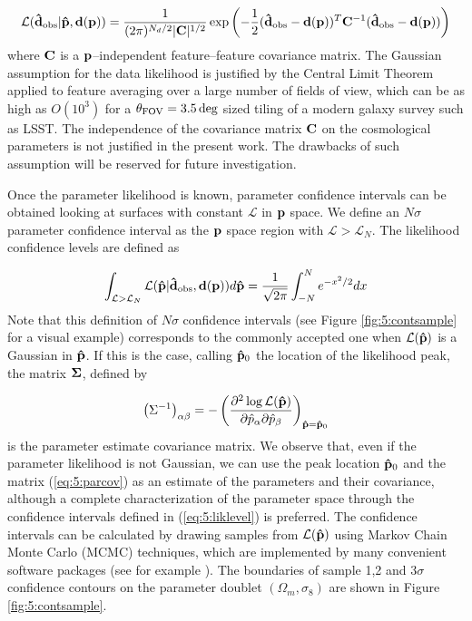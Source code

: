 \begin{equation}
\label{eq:5:gaussfeatlik}
\mathcal{L}(\mathbf{\hat{d}}_{\rm obs}\vert\mathbf{\hat{p}},\mathbf{d}(\mathbf{p})) = \frac{1}{(2\pi)^{N_d/2}\vert\mathbf{C}\vert^{1/2}}\exp\left(-\frac{1}{2}(\mathbf{\hat{d}}_{\rm obs}-\mathbf{d}(\mathbf{p}))^T\mathbf{C}^{-1}(\mathbf{\hat{d}}_{\rm obs}-\mathbf{d}(\mathbf{p}))\right) 
\end{equation}
%
where $\mathbf{C}$ is a $\mathbf{p}$--independent feature--feature covariance matrix. The Gaussian assumption for the data likelihood is justified by the Central Limit Theorem applied to feature averaging over a large number of fields of view, which can be as high as $O(10^3)$ for a $\theta_{\rm FOV}=3.5\,{\rm deg}$ sized tiling of a modern galaxy survey such as LSST. The independence of the covariance matrix $\mathbf{C}$ on the cosmological parameters is not justified in the present work. The drawbacks of such assumption will be reserved for future investigation. 

Once the parameter likelihood is known, parameter confidence intervals can be obtained looking at surfaces with constant $\mathcal{L}$ in $\mathbf{p}$ space. We define an $N\sigma$ parameter confidence interval as the $\mathbf{p}$ space region with $\mathcal{L}>\mathcal{L}_N$. The likelihood confidence levels are defined as 

\begin{equation}
\label{eq:5:liklevel}
\int_{\mathcal{L}>\mathcal{L}_N}\mathcal{L}(\mathbf{\hat{p}}\vert\mathbf{\hat{d}}_{\rm obs},\mathbf{d}(\mathbf{p})) d\mathbf{\hat{p}} = \frac{1}{\sqrt{2\pi}}\int_{-N}^Ne^{-x^2/2}dx
\end{equation}  
%
Note that this definition of $N\sigma$ confidence intervals (see Figure \ref{fig:5:contsample} for a visual example) corresponds to the commonly accepted one when $\mathcal{L}(\mathbf{\hat{p}})$ is a Gaussian in $\mathbf{\hat{p}}$. If this is the case, calling $\mathbf{\hat{p}}_0$ the location of the likelihood peak, the matrix $\mathbf{\Sigma}$, defined by

\begin{equation}
\label{eq:5:parcov}
\left(\Sigma^{-1}\right)_{\alpha\beta} = -\left(\frac{\partial^2\log\mathcal{L}(\mathbf{\hat{p}})}{\partial\hat{p}_\alpha\partial\hat{p}_\beta}\right)_{\mathbf{\hat{p}}=\mathbf{\hat{p}}_0}
\end{equation}
%
is the parameter estimate covariance matrix. We observe that, even if the parameter likelihood is not Gaussian, we can use the peak location $\mathbf{\hat{p}}_0$ and the matrix (\ref{eq:5:parcov}) as an estimate of the parameters and their covariance, although a complete characterization of the parameter space through the confidence intervals defined in (\ref{eq:5:liklevel}) is preferred. The confidence intervals can be calculated by drawing samples from $\mathcal{L}(\mathbf{\hat{p}})$ using Markov Chain Monte Carlo (MCMC) techniques, which are implemented by many convenient software packages (see for example \citep{emcee}). The boundaries of sample 1,2 and 3$\sigma$ confidence contours on the parameter doublet $(\Omega_m,\sigma_8)$ are shown in Figure \ref{fig:5:contsample}.


